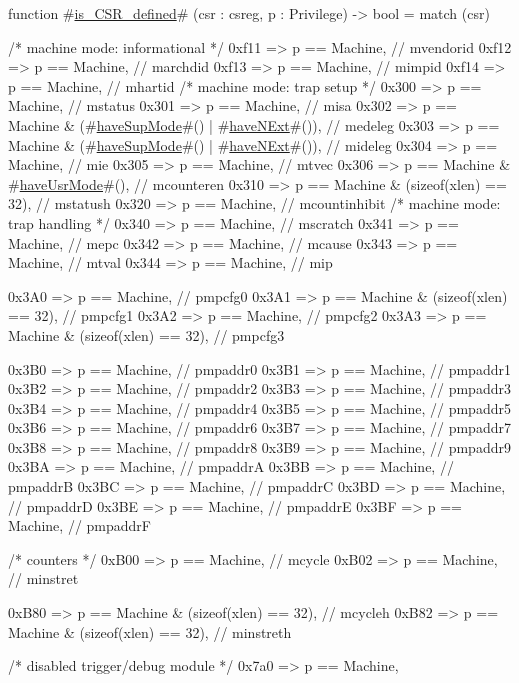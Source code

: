 function #\hyperref[sailRISCVziszyCSRzydefined]{is\_CSR\_defined}# (csr : csreg, p : Privilege) -> bool =
  match (csr) {
    /* machine mode: informational */
    0xf11 => p == Machine, // mvendorid
    0xf12 => p == Machine, // marchdid
    0xf13 => p == Machine, // mimpid
    0xf14 => p == Machine, // mhartid
    /* machine mode: trap setup */
    0x300 => p == Machine, // mstatus
    0x301 => p == Machine, // misa
    0x302 => p == Machine & (#\hyperref[sailRISCVzhaveSupMode]{haveSupMode}#() | #\hyperref[sailRISCVzhaveNExt]{haveNExt}#()), // medeleg
    0x303 => p == Machine & (#\hyperref[sailRISCVzhaveSupMode]{haveSupMode}#() | #\hyperref[sailRISCVzhaveNExt]{haveNExt}#()), // mideleg
    0x304 => p == Machine, // mie
    0x305 => p == Machine, // mtvec
    0x306 => p == Machine & #\hyperref[sailRISCVzhaveUsrMode]{haveUsrMode}#(), // mcounteren
    0x310 => p == Machine & (sizeof(xlen) == 32), // mstatush
    0x320 => p == Machine, // mcountinhibit
    /* machine mode: trap handling */
    0x340 => p == Machine, // mscratch
    0x341 => p == Machine, // mepc
    0x342 => p == Machine, // mcause
    0x343 => p == Machine, // mtval
    0x344 => p == Machine, // mip

    0x3A0 => p == Machine,                        // pmpcfg0
    0x3A1 => p == Machine & (sizeof(xlen) == 32), // pmpcfg1
    0x3A2 => p == Machine,                        // pmpcfg2
    0x3A3 => p == Machine & (sizeof(xlen) == 32), // pmpcfg3

    0x3B0 => p == Machine, // pmpaddr0
    0x3B1 => p == Machine, // pmpaddr1
    0x3B2 => p == Machine, // pmpaddr2
    0x3B3 => p == Machine, // pmpaddr3
    0x3B4 => p == Machine, // pmpaddr4
    0x3B5 => p == Machine, // pmpaddr5
    0x3B6 => p == Machine, // pmpaddr6
    0x3B7 => p == Machine, // pmpaddr7
    0x3B8 => p == Machine, // pmpaddr8
    0x3B9 => p == Machine, // pmpaddr9
    0x3BA => p == Machine, // pmpaddrA
    0x3BB => p == Machine, // pmpaddrB
    0x3BC => p == Machine, // pmpaddrC
    0x3BD => p == Machine, // pmpaddrD
    0x3BE => p == Machine, // pmpaddrE
    0x3BF => p == Machine, // pmpaddrF

    /* counters */
    0xB00 => p == Machine, // mcycle
    0xB02 => p == Machine, // minstret

    0xB80 => p == Machine & (sizeof(xlen) == 32), // mcycleh
    0xB82 => p == Machine & (sizeof(xlen) == 32), // minstreth

    /* disabled trigger/debug module */
    0x7a0 => p == Machine,

}
